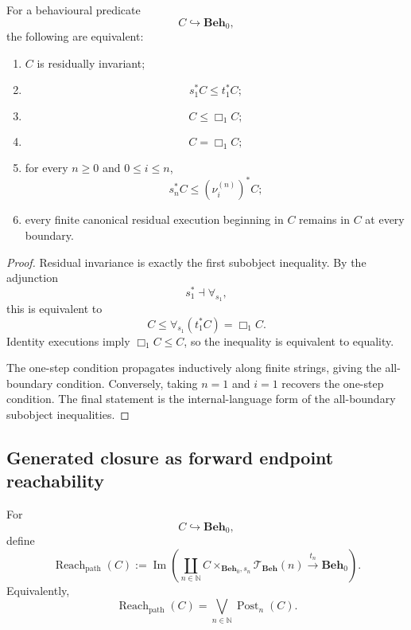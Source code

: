 \begin{theorem}
\label{thm:finite-path-characterization-derivative-invariance}
For a behavioural predicate
\[
    C\hookrightarrow\mathbf{Beh}_0,
\]
the following are equivalent:
\begin{enumerate}
    \item \(C\) is residually invariant;
    \item
    \[
        s_1^\ast C\leq t_1^\ast C;
    \]
    \item
    \[
        C\leq\Box_1C;
    \]
    \item
    \[
        C=\Box_1C;
    \]
    \item for every \(n\geq0\) and \(0\leq i\leq n\),
    \[
        s_n^\ast C
        \leq
        (\nu_i^{(n)})^\ast C;
    \]
    \item every finite canonical residual execution beginning in \(C\)
    remains in \(C\) at every boundary.
\end{enumerate}
\end{theorem}

\begin{proof}
Residual invariance is exactly the first subobject inequality. By the
adjunction
\[
    s_1^\ast\dashv\forall_{s_1},
\]
this is equivalent to
\[
    C\leq\forall_{s_1}(t_1^\ast C)=\Box_1C.
\]
Identity executions imply \(\Box_1C\leq C\), so the inequality is
equivalent to equality.

The one-step condition propagates inductively along finite strings, giving
the all-boundary condition. Conversely, taking \(n=1\) and \(i=1\)
recovers the one-step condition. The final statement is the internal-language
form of the all-boundary subobject inequalities.
\end{proof}

\subsection{Generated closure as forward endpoint reachability}
\label{subsec:generated-closure-endpoint-reachability}

For
\[
    C\hookrightarrow\mathbf{Beh}_0,
\]
define
\[
    \operatorname{Reach}_{\mathrm{path}}(C)
    :=
    \operatorname{Im}
    \left(
        \coprod_{n\in\mathbb N}
        C\times_{\mathbf{Beh}_0,s_n}
        \mathscr T_{\mathbf{Beh}}(n)
        \xrightarrow{\ t_n\ }
        \mathbf{Beh}_0
    \right).
\]
Equivalently,
\[
    \operatorname{Reach}_{\mathrm{path}}(C)
    =
    \bigvee_{n\in\mathbb N}
    \operatorname{Post}_n(C).
\]

